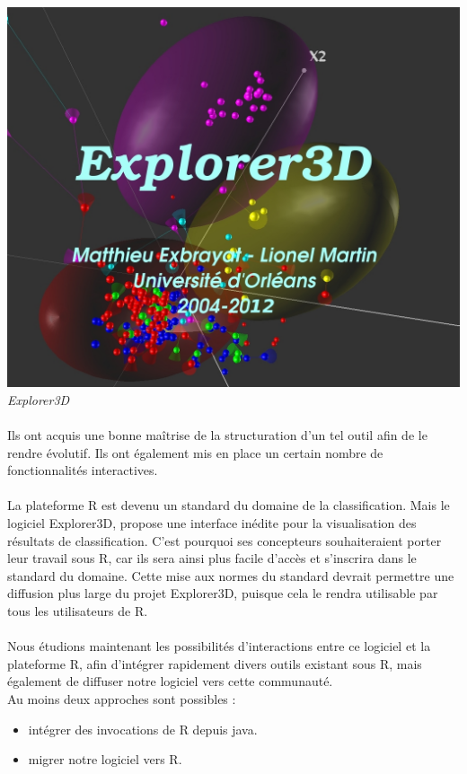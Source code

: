 \begin{center}
\includegraphics[scale=0.3]{explorer3d.jpg}\\
\textit{Explorer3D}
\end{center}

\paragraph{}
Ils ont acquis une bonne maîtrise de la structuration d'un tel outil afin de le rendre évolutif. Ils ont également mis en place un certain nombre de fonctionnalités interactives.
\newpage

\paragraph{} La plateforme R est devenu un standard du domaine de la classification. Mais le logiciel Explorer3D, propose une interface inédite pour la visualisation des résultats de classification. C'est pourquoi ses concepteurs souhaiteraient porter leur travail sous R, car ils sera ainsi plus facile d'accès et s'inscrira dans le standard du domaine. Cette mise aux normes du standard devrait permettre une diffusion plus large du projet Explorer3D, puisque cela le rendra utilisable par tous les utilisateurs de R.

\paragraph{}
Nous étudions maintenant les possibilités d'interactions entre ce logiciel et la plateforme R, afin d'intégrer rapidement divers outils existant sous R, mais également de diffuser notre logiciel vers cette communauté.\\
Au moins deux approches sont possibles :
\begin{itemize}
\item intégrer des invocations de R depuis java.
\item migrer notre logiciel vers R.
\end{itemize}

